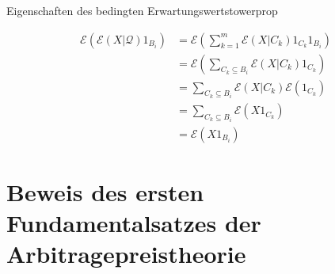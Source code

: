 \documentclass[11pt]{report} %
\begin{document}
\begin{Beweis}{Eigenschaften des bedingten Erwartungswerts}{towerprop}
\begin{enumerate}
    \begin{align*}
        \mathcal{E}(\mathcal{E}(X|\mathcal{Q})1_{B_i})&=\mathcal{E}\left(\sum_{k=1}^{m}\mathcal{E}(X|C_k)1_{C_k}1_{B_i}\right)\\
        &=\mathcal{E}\left(\sum_{C_k\subseteq B_i}\mathcal{E}(X|C_k)1_{C_k}\right)\\
        &=\sum_{C_k\subseteq B_i}\mathcal{E}(X|C_k)\mathcal{E}(1_{C_k})\\
        &=\sum_{C_k\subseteq B_i}\mathcal{E}(X1_{C_k})\\
        &=\mathcal{E}(X1_{B_i})
    \end{align*}
    \end{enumerate}
\end{Beweis}

\section{Beweis des ersten Fundamentalsatzes der Arbitragepreistheorie}
\end{document}
